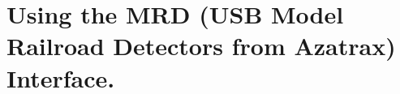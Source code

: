 

\chapter{Using the MRD (USB Model Railroad Detectors from Azatrax) Interface.}
\label{chapt:MRD:MRDProgramming}

